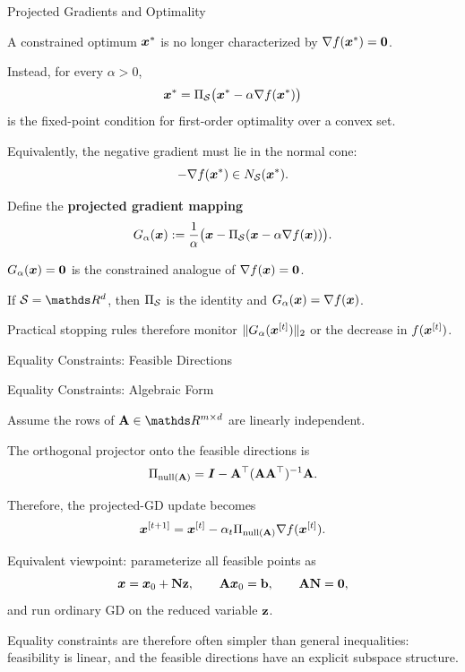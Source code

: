 \documentclass[11pt,compress,t,notes=noshow, xcolor=table]{beamer}
\begin{document}
\begin{framei}[fs=small]{Projected Gradients and Optimality}
\item A constrained optimum $\xvs$ is no longer characterized by $\nabla f(\xvs) = \zero$.
\item Instead, for every $\alpha > 0$,
$$
\xvs = \Pi_{\S}\big(\xvs - \alpha \nabla f(\xvs)\big)
$$
is the fixed-point condition for first-order optimality over a convex set.
\item Equivalently, the negative gradient must lie in the normal cone:
$$
-\nabla f(\xvs) \in N_{\S}(\xvs).
$$
\item Define the \textbf{projected gradient mapping}
$$
G_{\alpha}(\xv) := \frac{1}{\alpha}\big(\xv - \Pi_{\S}(\xv - \alpha \nabla f(\xv))\big).
$$
\item $G_{\alpha}(\xv) = \zero$ is the constrained analogue of $\nabla f(\xv) = \zero$.
\item If $\S = \R^d$, then $\Pi_{\S}$ is the identity and $G_{\alpha}(\xv) = \nabla f(\xv)$.
\item Practical stopping rules therefore monitor $\|G_{\alpha}(\xv^{[t]})\|_2$ or the decrease in $f(\xv^{[t]})$.
\end{framei}


\begin{framev}{Equality Constraints: Feasible Directions}
\end{framev}


\begin{framei}[fs=small]{Equality Constraints: Algebraic Form}
\item Assume the rows of $\Amat \in \R^{m \times d}$ are linearly independent.
\item The orthogonal projector onto the feasible directions is
$$
\Pi_{\mathrm{null}(\Amat)} = \id - \Amat^\top(\Amat \Amat^\top)^{-1}\Amat.
$$
\item Therefore, the projected-GD update becomes
$$
\xv^{[t+1]} = \xv^{[t]} - \alpha_t \Pi_{\mathrm{null}(\Amat)} \nabla f(\xv^{[t]}).
$$
\item Equivalent viewpoint: parameterize all feasible points as
$$
\xv = \xv_0 + \mathbf{N}\zv, \qquad \Amat \xv_0 = \bv, \qquad \Amat \mathbf{N} = \zero,
$$
and run ordinary GD on the reduced variable $\zv$.
\item Equality constraints are therefore often simpler than general inequalities: feasibility is linear, and the feasible directions have an explicit subspace structure.
\end{framei}
\end{document}
